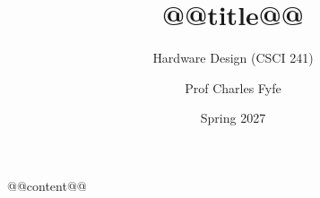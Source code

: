 \documentclass{scrartcl}
\title{@@title@@}
\subtitle{Hardware Design (CSCI 241)}
\author{Prof Charles Fyfe}
\date{Spring 2027}
\begin{document}
\maketitle
\tableofcontents
\newpage

@@content@@
\end{document}
